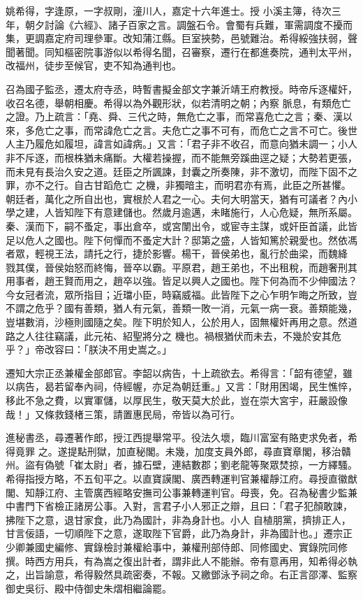 \begin{pinyinscope}
 姚希得，字逢原，一字叔剛，潼川人，嘉定十六年進士。授
 小溪主簿，待次三年，朝夕討論《六經》、諸子百家之言。調盤石令。會蜀有兵難，軍需調度不擾而集，更調嘉定府司理參軍。改知蒲江縣。巨室挾勢，邑號難治。希得綏強扶弱，聲聞著聞。同知樞密院事游似以希得名聞，召審察，遷行在都進奏院，通判太平州，改福州，徒步至候官，吏不知為通判也。



 召為國子監丞，遷太府寺丞，時暫書擬金部文字兼沂靖王府教授。時帝斥逐權奸，收召名德，舉朝相慶。希得以為外觀形狀，似若清明之朝；內察
 脈息，有類危亡之證。乃上疏言：「堯、舜、三代之時，無危亡之事，而常喜危亡之言；秦、漢以來，多危亡之事，而常諱危亡之言。夫危亡之事不可有，而危亡之言不可亡。後世人主乃履危如履坦，諱言如諱病。」又言：「君子非不收召，而意向猶未調一；小人非不斥逐，而根株猶未痛斷。大權若操握，而不能無旁蹊曲逕之疑；大勢若更張，而未見有長治久安之道。廷臣之所諷諫，封囊之所奏陳，非不激切，而陛下固不之罪，亦不之行。自古甘蹈危亡
 之機，非獨暗主，而明君亦有焉，此臣之所甚懼。朝廷者，萬化之所自出也，實根於人君之一心。夫何大明當天，猶有可議者？內小學之建，人皆知陛下有意建儲也。然歲月逾邁，未睹施行，人心危疑，無所系屬。秦、漢而下，嗣不蚤定，事出倉卒，或宮闈出令，或宦寺主謀，或奸臣首議，此皆足以危人之國也。陛下何憚而不蚤定大計？邸第之盛，人皆知篤於親愛也。然依馮者眾，輕視王法，請托之行，捷於影響。楊干，晉侯弟也，亂行於曲梁，而魏絳
 戮其僕，晉侯始怒而終悔，晉卒以霸。平原君，趙王弟也，不出租稅，而趙奢刑其用事者，趙王賢而用之，趙卒以強。皆足以興人之國也。陛下何為而不少伸國法？今女冠者流，眾所指目；近璫小臣，時竊威福。此皆陛下之心乍明乍晦之所致，豈不謂之危乎？國有善類，猶人有元氣，善類一敗一消，元氣一病一衰。善類能幾，豈堪數消，沙極則國隨之矣。陛下明於知人，公於用人，固無權奸再用之意。然道路之人往往竊議，此元祐、紹聖將分之
 機也。禍根猶伏而未去，不幾於安其危乎？」帝改容曰：「朕決不用史嵩之。」



 遷知大宗正丞兼權金部郎官。李韶以病告，十上疏欲去。希得言：「韶有德望，雖以病告，曷若留奉內祠，侍經幄，亦足為朝廷重。」又言：「財用困竭，民生憔悴，移此不急之費，以實軍儲，以厚民生，敬天莫大於此，豈在崇大宮宇，莊嚴設像哉！」又條救錢楮三策，請置惠民局，帝皆以為可行。



 進秘書丞，尋遷著作郎，授江西提舉常平。役法久壞，臨川富室有賂吏求免者，希得竟罪
 之。遂提點刑獄，加直秘閣。未幾，加度支員外郎，尋直寶章閣，移治贛州。盜有偽號「崔太尉」者，據石壁，連結數郡；劉老龍等聚眾焚掠，一方繹騷。希得指授方略，不五旬平之。以直寶謨閣、廣西轉運判官兼權靜江府。尋授直徽猷閣、知靜江府、主管廣西經略安撫司公事兼轉運判官。母喪，免。召為秘書少監兼中書門下省檢正諸房公事。入對，言君子小人邪正之辯，且曰：「君子犯顏敢諫，拂陛下之意，退甘家食，此乃為國計，非為身計也。小人
 自植朋黨，擠排正人，甘言佞語，一切順陛下之意，遂取陛下官爵，此乃為身計，非為國計也。」遷宗正少卿兼國史編修、實錄檢討兼權給事中，兼權刑部侍郎、同修國史、實錄院同修撰。時西方用兵，有為嵩之復出計者，謂非此人不能辦。帝有意再用，知希得必執之，出旨諭意，希得毅然具疏密奏，不報。又繳鄧泳予祠之命。右正言邵澤、監察御史吳衍、殿中侍御史朱熠相繼論罷。




\end{pinyinscope}
